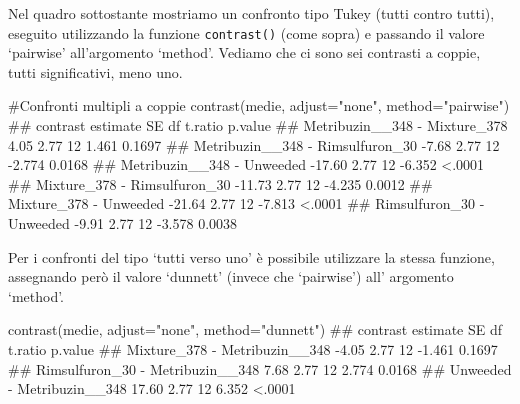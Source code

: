 \documentclass[a4paper,12pt,oneside]{book}
\newenvironment{Shaded}{\begin{snugshade}}{\end{snugshade}}
\newcommand{\StringTok}[1]{#1}
\newcommand{\CommentTok}[1]{#1}
\newcommand{\DocumentationTok}[1]{#1}
\newcommand{\FunctionTok}[1]{#1}
\newcommand{\AttributeTok}[1]{#1}
\newcommand{\NormalTok}[1]{#1}
\begin{document}
Nel quadro sottostante mostriamo un confronto tipo Tukey (tutti contro tutti), eseguito utilizzando la funzione \texttt{contrast()} (come sopra) e passando il valore `pairwise' all'argomento `method'. Vediamo che ci sono sei contrasti a coppie, tutti significativi, meno uno.

\footnotesize

\begin{Shaded}
\begin{Highlighting}[]
\CommentTok{\#Confronti multipli a coppie}
\FunctionTok{contrast}\NormalTok{(medie, }\AttributeTok{adjust=}\StringTok{"none"}\NormalTok{, }\AttributeTok{method=}\StringTok{"pairwise"}\NormalTok{)}
\DocumentationTok{\#\#  contrast                         estimate   SE df t.ratio p.value}
\DocumentationTok{\#\#  Metribuzin\_\_348 {-} Mixture\_378        4.05 2.77 12   1.461  0.1697}
\DocumentationTok{\#\#  Metribuzin\_\_348 {-} Rimsulfuron\_30    {-}7.68 2.77 12  {-}2.774  0.0168}
\DocumentationTok{\#\#  Metribuzin\_\_348 {-} Unweeded         {-}17.60 2.77 12  {-}6.352  \textless{}.0001}
\DocumentationTok{\#\#  Mixture\_378 {-} Rimsulfuron\_30       {-}11.73 2.77 12  {-}4.235  0.0012}
\DocumentationTok{\#\#  Mixture\_378 {-} Unweeded             {-}21.64 2.77 12  {-}7.813  \textless{}.0001}
\DocumentationTok{\#\#  Rimsulfuron\_30 {-} Unweeded           {-}9.91 2.77 12  {-}3.578  0.0038}
\end{Highlighting}
\end{Shaded}

\normalsize

Per i confronti del tipo `tutti verso uno' è possibile utilizzare la stessa funzione, assegnando però il valore `dunnett' (invece che `pairwise') all' argomento `method'.

\small

\begin{Shaded}
\begin{Highlighting}[]
\FunctionTok{contrast}\NormalTok{(medie, }\AttributeTok{adjust=}\StringTok{"none"}\NormalTok{, }\AttributeTok{method=}\StringTok{"dunnett"}\NormalTok{)}
\DocumentationTok{\#\#  contrast                         estimate   SE df t.ratio p.value}
\DocumentationTok{\#\#  Mixture\_378 {-} Metribuzin\_\_348       {-}4.05 2.77 12  {-}1.461  0.1697}
\DocumentationTok{\#\#  Rimsulfuron\_30 {-} Metribuzin\_\_348     7.68 2.77 12   2.774  0.0168}
\DocumentationTok{\#\#  Unweeded {-} Metribuzin\_\_348          17.60 2.77 12   6.352  \textless{}.0001}
\end{Highlighting}
\end{Shaded}
\end{document}
